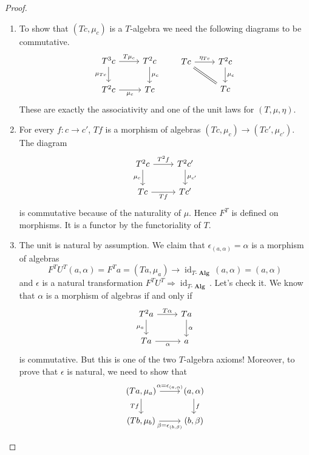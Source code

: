 \documentclass[a4paper,11pt,twoside, openany]{book}
\DeclareMathOperator{\Alg}{\mathbf{Alg}}
\DeclareMathOperator{\id}{id}
\theoremstyle{definition}
\theoremstyle{definition}
\theoremstyle{remark}
\begin{document}
\begin{proof}
	\begin{enumerate}[label=(\roman*)]
		\item To show that $(Tc, \mu_c)$ is a $T$-algebra we need the following diagrams to be commutative.
		\[
		\begin{tikzcd}
		T^3c\ar["\mu_{Tc}"', rightarrow]{d}\ar["T\mu_c", rightarrow]{r}
		& T^2c\ar["\mu_c", rightarrow]{d} \\
		T^2c\ar["\mu_c"', rightarrow]{r}
		& Tc
		\end{tikzcd}
		\quad\quad
		\begin{tikzcd}
		Tc\ar["\eta_{Tc}",rightarrow]{r}\ar[equal]{dr}
		& T^2c\ar["\mu_c", rightarrow]{d}
		\\
		& Tc
		\end{tikzcd}
		\]
		These are exactly the associativity and one of the unit laws for $(T, \mu, \eta)$.
	\item For every $f\colon c\to c'$, $Tf$ is a morphism of algebras $(Tc,\mu_c)\to(Tc', \mu_{c'})$. The diagram 
		\[
	\begin{tikzcd}
	T^2c\ar["\mu_{c}"', rightarrow]{d}\ar["T^2f", rightarrow]{r}
	& T^2c'\ar["\mu_{c'}", rightarrow]{d} \\
	Tc\ar["Tf"', rightarrow]{r}
	& Tc'
	\end{tikzcd}
		\]
	is commutative because of the naturality of $\mu$. Hence $F^T$ is defined on morphisms. It is a functor by the functoriality of $T$.
	\item The unit is natural by assumption. We claim that $\epsilon_{(a,\alpha)}=\alpha$ is a morphism of algebras $$F^TU^T(a,\alpha)=F^Ta=(Ta,\mu_a) \to \id_{T\mbox{-}\Alg}(a,\alpha)=(a,\alpha)$$ and $\epsilon$ is a natural transformation $F^TU^T\Rightarrow\id_{T\mbox{-}\Alg}$. Let's check it. We know that $\alpha$ is a morphism of algebras if and only if 
	\[	
	\begin{tikzcd}
	T^2 a\ar["\mu_{a}"']{d}\ar["T\alpha"]{r}
	& Ta\ar["\alpha"]{d} \\
	Ta\ar["\alpha"']{r}
	& a
	\end{tikzcd}
	\]
	is commutative. But this is one of the two $T$-algebra axioms! Moreover, to prove that $\epsilon$ is natural, we need to show that
		\[	
	\begin{tikzcd}
	(Ta,\mu_a) \ar["Tf"']{d}\ar["\alpha=\epsilon_{(a,\alpha)}"]{r}
	& (a,\alpha)\ar["f"]{d} \\
	(Tb,\mu_b)\ar["\beta=\epsilon_{(b,\beta)}"']{r}
	& (b,\beta)
	\end{tikzcd}
\]
\end{enumerate}
\end{proof}
\end{document}
